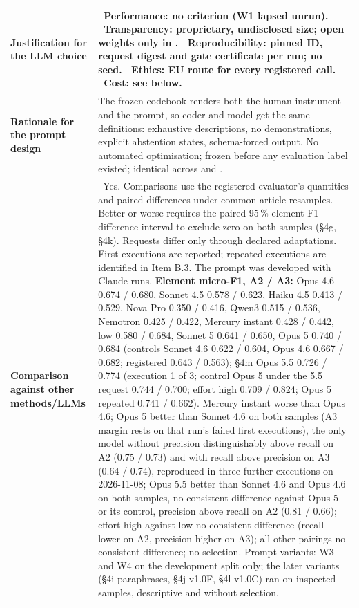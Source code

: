 \documentclass[12pt]{article}
\providecommand{\checked}{\ding{110}}   %
\providecommand{\unchecked}{\ding{111}} %
\begin{document}
{\begin{longtable}{|J|K|}
\textbf{Justification for the LLM choice}
&
\unchecked~Performance: no criterion (W1 lapsed unrun). \checked~Transparency: proprietary, undisclosed size; open weights only in . \checked~Reproducibility: pinned ID, request digest and gate certificate per run; no seed. \checked~Ethics: EU route for every registered call. \checked~Cost: see below.
\\
\hline
\textbf{Rationale for the prompt design}
&
The frozen codebook renders both the human instrument and the prompt, so coder and model get the same definitions: exhaustive descriptions, no demonstrations, explicit abstention states, schema-forced output. No automated optimisation; frozen before any evaluation label existed; identical across  and .
\\
\hline
\textbf{Comparison against other methods/LLMs}
&
\checked~Yes. Comparisons use the registered evaluator's quantities and paired differences under common article resamples. Better or worse requires the paired 95\,\% element-F1 difference interval to exclude zero on both samples (\S4g, \S4k). Requests differ only through declared adaptations. First executions are reported; repeated executions are identified in Item B.3. The prompt was developed with Claude runs. \textbf{Element micro-F1, A2 / A3:} Opus 4.6 0.674 / 0.680, Sonnet 4.5 0.578 / 0.623, Haiku 4.5 0.413 / 0.529, Nova Pro 0.350 / 0.416, Qwen3 0.515 / 0.536, Nemotron 0.425 / 0.422, Mercury instant 0.428 / 0.442, low 0.580 / 0.684, Sonnet 5 0.641 / 0.650, Opus 5 0.740 / 0.684 (controls Sonnet 4.6 0.622 / 0.604, Opus 4.6 0.667 / 0.682; registered 0.643 / 0.563); \S4m Opus 5.5 0.726 / 0.774 (execution 1 of 3; control Opus 5 under the 5.5 request 0.744 / 0.700; effort high 0.709 / 0.824; Opus 5 repeated 0.741 / 0.662). Mercury instant worse than Opus 4.6; Opus 5 better than Sonnet 4.6 on both samples (A3 margin rests on that run's failed first executions), the only model without precision distinguishably above recall on A2 (0.75 / 0.73) and with recall above precision on A3 (0.64 / 0.74), reproduced in three further executions on 2026-11-08; Opus 5.5 better than Sonnet 4.6 and Opus 4.6 on both samples, no consistent difference against Opus 5 or its control, precision above recall on A2 (0.81 / 0.66); effort high against low no consistent difference (recall lower on A2, precision higher on A3); all other pairings no consistent difference; no selection. Prompt variants: W3 and W4 on the development split only; the later variants (\S4i paraphrases, \S4j v1.0F, \S4l v1.0C) ran on inspected samples, descriptive and without selection.

\end{longtable}}
\end{document}
